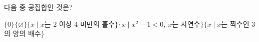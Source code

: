 다음 중 공집합인 것은?
\begin{choicesv}{$\{0\}$}{$\{\varnothing\}$}{$\{x \mid x$는 $2$ 이상 $4$ 미만의 홀수$\}$}{$\{x \mid x^2-1<0,\ x$는 자연수$\}$}{$\{x \mid x$는 짝수인 $3$의 양의 배수$\}$}\end{choicesv}
